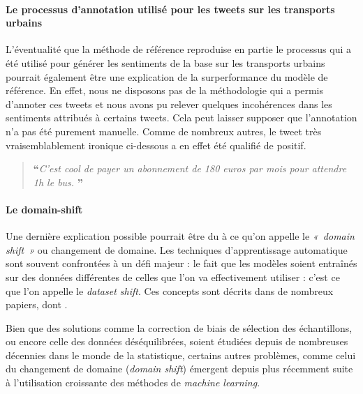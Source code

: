\documentclass[11pt,french,french]{article}
\begin{document}
\hypertarget{le-processus-dannotation-utilisuxe9-pour-les-tweets-sur-les-transports-urbains}{%
\paragraph{Le processus d'annotation utilisé pour les tweets sur les transports urbains}\label{le-processus-dannotation-utilisuxe9-pour-les-tweets-sur-les-transports-urbains}}

L'éventualité que la méthode de référence reproduise en partie le processus qui a été utilisé pour générer les sentiments de la base sur les transports urbains pourrait également être une explication de la surperformance du modèle de référence.
En effet, nous ne disposons pas de la méthodologie qui a permis d'annoter ces tweets et nous avons pu relever quelques incohérences dans les sentiments attribués à certains tweets. Cela peut laisser supposer que l'annotation n'a pas été purement manuelle.
Comme de nombreux autres, le tweet très vraisemblablement ironique ci-dessous a en effet été qualifié de positif.

\begin{quote}
\LARGE \textbf{``}\normalsize \emph{C'est cool de payer un abonnement de 180 euros par mois pour attendre 1h le bus.} \LARGE \textbf{''}\normalsize
\end{quote}

\hypertarget{le-domain-shift}{%
\paragraph{Le domain-shift}\label{le-domain-shift}}

Une dernière explication possible pourrait être du à ce qu'on appelle le \emph{« domain shift »} ou changement de domaine.
Les techniques d'apprentissage automatique sont souvent confrontées à un défi majeur : le fait que les modèles soient entraînés sur des données différentes de celles que l'on va effectivement utiliser : c'est ce que l'on appelle le \emph{dataset shift}.
Ces concepts sont décrits dans de nombreux papiers, dont \cite{Candela}.

Bien que des solutions comme la correction de biais de sélection des échantillons, ou encore celle des données déséquilibrées, soient étudiées depuis de nombreuses décennies dans le monde de la statistique, certains autres problèmes, comme celui du changement de domaine (\emph{domain shift}) émergent depuis plus récemment suite à l'utilisation croissante des méthodes de \emph{machine learning}.
\end{document}

